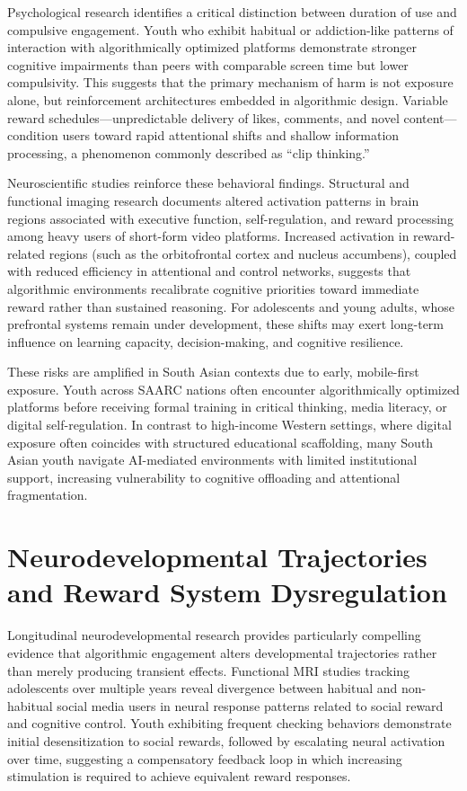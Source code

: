 \documentclass[12pt,a4paper]{report}
\begin{document}
Psychological research identifies a critical distinction between duration of use and compulsive engagement. Youth who exhibit habitual or addiction-like patterns of interaction with algorithmically optimized platforms demonstrate stronger cognitive impairments than peers with comparable screen time but lower compulsivity. This suggests that the primary mechanism of harm is not exposure alone, but reinforcement architectures embedded in algorithmic design. Variable reward schedules—unpredictable delivery of likes, comments, and novel content—condition users toward rapid attentional shifts and shallow information processing, a phenomenon commonly described as ``clip thinking.''

Neuroscientific studies reinforce these behavioral findings. Structural and functional imaging research documents altered activation patterns in brain regions associated with executive function, self-regulation, and reward processing among heavy users of short-form video platforms. Increased activation in reward-related regions (such as the orbitofrontal cortex and nucleus accumbens), coupled with reduced efficiency in attentional and control networks, suggests that algorithmic environments recalibrate cognitive priorities toward immediate reward rather than sustained reasoning. For adolescents and young adults, whose prefrontal systems remain under development, these shifts may exert long-term influence on learning capacity, decision-making, and cognitive resilience.

These risks are amplified in South Asian contexts due to early, mobile-first exposure. Youth across SAARC nations often encounter algorithmically optimized platforms before receiving formal training in critical thinking, media literacy, or digital self-regulation. In contrast to high-income Western settings, where digital exposure often coincides with structured educational scaffolding, many South Asian youth navigate AI-mediated environments with limited institutional support, increasing vulnerability to cognitive offloading and attentional fragmentation.

\section{Neurodevelopmental Trajectories and Reward System Dysregulation}

Longitudinal neurodevelopmental research provides particularly compelling evidence that algorithmic engagement alters developmental trajectories rather than merely producing transient effects. Functional MRI studies tracking adolescents over multiple years reveal divergence between habitual and non-habitual social media users in neural response patterns related to social reward and cognitive control. Youth exhibiting frequent checking behaviors demonstrate initial desensitization to social rewards, followed by escalating neural activation over time, suggesting a compensatory feedback loop in which increasing stimulation is required to achieve equivalent reward responses.
\end{document}
